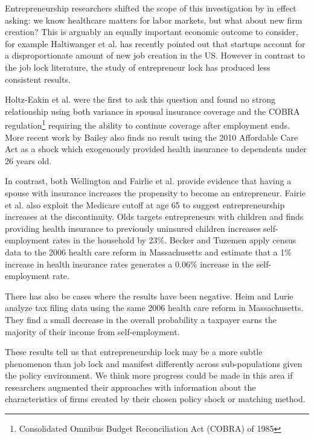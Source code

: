 \documentclass[12pt]{article}
\begin{document}
Entrepreneurship researchers shifted the scope of this investigation by in effect asking: we know healthcare matters for labor markets, but what about new firm creation? This is arguably an equally important economic outcome to consider, for example Haltiwanger et al. \citep{haltiwanger2013creates} has recently pointed out that startups account for a disproportionate amount of new job creation in the US. However in contrast to the job lock literature, the study of entrepreneur lock has produced less consistent results. 

Holtz-Eakin et al. \citep{holtz1996health}  were the first to ask this question and found no strong relationship using both variance in spousal insurance coverage and the COBRA regulation\footnote{Consolidated Omnibus Budget Reconciliation Act (COBRA) of 1985} requiring the ability to continue coverage after employment ends. More recent work by Bailey \citep{bailey2014health} also finds no result using the 2010 Affordable Care Act as a shock which exogenously provided health insurance to dependents under 26 years old. 

In contrast, both Wellington \citep{wellington2001health} and Fairlie et al. \citep{fairlie2011employer} provide evidence that having a spouse with insurance increases the propensity to become an entrepreneur. Fairie et al. \citep{fairlie2011employer} also exploit the Medicare cutoff at age 65 to suggest entrepreneurship increases at the discontinuity. Olds 
\citep{olds2014entrepreneurship} targets entrepreneurs with children and finds providing health insurance to previously uninsured children increases self-employment rates in the household by 23\%.  Becker and Tuzemen \citep{tuzemen2014self} apply census data to the 2006 health care reform in Massachusetts and estimate that a 1\% increase in health insurance rates generates a 0.06\% increase in the self-employment rate. 

There has also be cases where the results have been negative. Heim and Lurie \citep{heim2014does} analyze tax filing data using the same 2006 health care reform in Massachusetts. They find a small decrease in the overall probability a taxpayer earns the majority of their income from self-employment.

These results tell us that entrepreneurship lock may be a more subtle phenomenon than job lock and manifest differently across sub-populations given the policy environment. We think more progress could be made in this area if researchers augmented their approaches with information about the characteristics of firms created by their chosen policy shock or matching method. 
\end{document}
